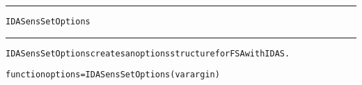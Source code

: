 \begin{samepage}
\hrule
\begin{center}
{\large \verb!IDASensSetOptions!}
\label{p:IDASensSetOptions}
\end{center}
\hrule\vspace{0.1in}



\begin{alltt}
IDASensSetOptions creates an options structure for FSA with IDAS.
\end{alltt}

\end{samepage}



\begin{samepage}


\begin{alltt}
function options = IDASensSetOptions(varargin) 
\end{alltt}

\end{samepage}



